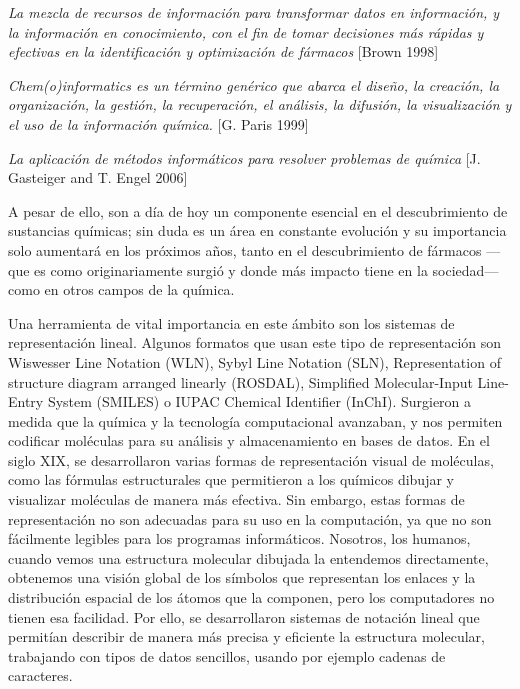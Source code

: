 \begin{center}
\small
\textit{La mezcla de recursos de información para transformar datos en información, y la información en conocimiento, con el fin de tomar decisiones más rápidas y efectivas en la identificación y optimización de fármacos} [Brown 1998]
\end{center}

\begin{center}
\small
\textit{Chem(o)informatics es un término genérico que abarca el diseño, la creación, la organización, la gestión, la recuperación, el análisis, la difusión, la visualización y el uso de la información química. }[G. Paris 1999]
\end{center}

\begin{center}
\small
\textit{La aplicación de métodos informáticos para resolver problemas de química} [J. Gasteiger and T. Engel 2006]
\end{center}


A pesar de ello, son a día de hoy un componente esencial en el descubrimiento de sustancias químicas; sin duda es un área en constante evolución y su importancia solo aumentará en los próximos años, tanto en el descubrimiento de fármacos —que es como originariamente surgió y donde más impacto tiene en la sociedad— como en otros campos de la química.


Una herramienta de vital importancia en este ámbito son los sistemas de representación lineal. Algunos formatos que usan este tipo de representación son Wiswesser Line Notation (WLN), Sybyl Line Notation (SLN), Representation of structure diagram arranged linearly (ROSDAL), Simplified Molecular-Input Line-Entry System (SMILES) o IUPAC Chemical Identifier (InChI). Surgieron a medida que la química y la tecnología computacional avanzaban, y nos permiten codificar moléculas para su análisis y almacenamiento en bases de datos. En el siglo XIX, se desarrollaron varias formas de representación visual de moléculas, como las fórmulas estructurales que permitieron a los químicos dibujar y visualizar moléculas de manera más efectiva. Sin embargo, estas formas de representación no son adecuadas para su uso en la computación, ya que no son fácilmente legibles para los programas informáticos. Nosotros, los humanos, cuando vemos una estructura molecular dibujada la entendemos directamente, obtenemos una visión global de los símbolos que representan los enlaces y la distribución espacial de los átomos que la componen, pero los computadores no tienen esa facilidad. Por ello, se desarrollaron sistemas de notación lineal que permitían describir de manera más precisa y eficiente la estructura molecular, trabajando con tipos de datos sencillos, usando por ejemplo cadenas de caracteres.



